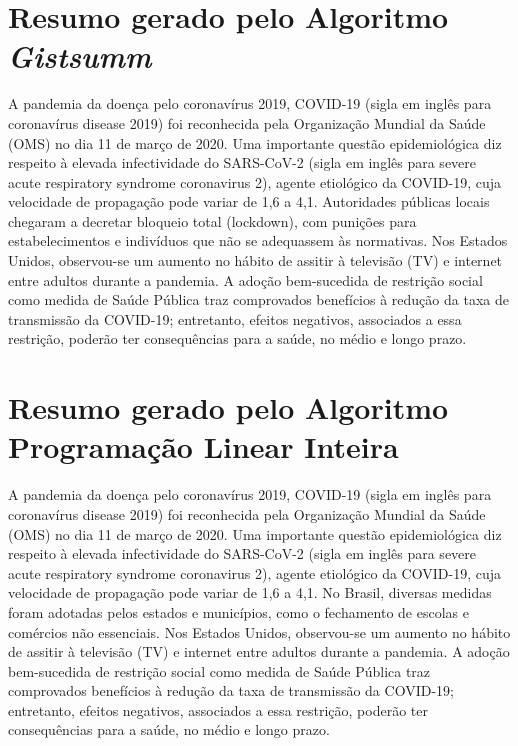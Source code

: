 \section{Resumo gerado pelo Algoritmo \textit{Gistsumm}}
\label{chap:gistsumm_resumo}
A pandemia da doença pelo coronavírus 2019, COVID-19 (sigla em inglês para coronavírus disease 2019) foi reconhecida pela Organização Mundial da Saúde (OMS) no dia 11 de março de 2020.
Uma importante questão epidemiológica diz respeito à elevada infectividade do SARS-CoV-2 (sigla em inglês para severe acute respiratory syndrome coronavirus 2), agente etiológico da COVID-19, cuja velocidade de propagação pode variar de 1,6 a 4,1.
Autoridades públicas locais chegaram a decretar bloqueio total (lockdown), com punições para estabelecimentos e indivíduos que não se adequassem às normativas.
Nos Estados Unidos, observou-se um aumento no hábito de assitir à televisão (TV) e internet entre adultos durante a pandemia.
A adoção bem-sucedida de restrição social como medida de Saúde Pública traz comprovados benefícios à redução da taxa de transmissão da COVID-19; entretanto, efeitos negativos, associados a essa restrição, poderão ter consequências para a saúde, no médio e longo prazo.

\section{Resumo gerado pelo Algoritmo Programação Linear Inteira}
\label{chap:pli_resumo}
A pandemia da doença pelo coronavírus 2019, COVID-19 (sigla em inglês para coronavírus disease 2019) foi reconhecida pela Organização Mundial da Saúde (OMS) no dia 11 de março de 2020.
Uma importante questão epidemiológica diz respeito à elevada infectividade do SARS-CoV-2 (sigla em inglês para severe acute respiratory syndrome coronavirus 2), agente etiológico da COVID-19, cuja velocidade de propagação pode variar de 1,6 a 4,1.
No Brasil, diversas medidas foram adotadas pelos estados e municípios, como o fechamento de escolas e comércios não essenciais.
Nos Estados Unidos, observou-se um aumento no hábito de assitir à televisão (TV) e internet entre adultos durante a pandemia.
A adoção bem-sucedida de restrição social como medida de Saúde Pública traz comprovados benefícios à redução da taxa de transmissão da COVID-19; entretanto, efeitos negativos, associados a essa restrição, poderão ter consequências para a saúde, no médio e longo prazo.

